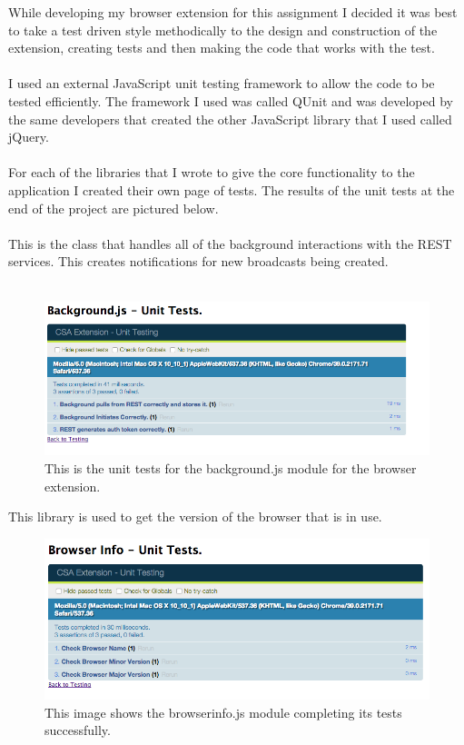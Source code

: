 \documentclass{article}
\begin{document}
While developing my browser extension for this assignment I decided it was best to take a test driven style methodically to the design and construction of the extension, creating tests and then making the code that works with the test.\\
\\
I used an external JavaScript unit testing framework to allow the code to be tested efficiently. The framework I used was called QUnit and was developed by the same developers that created the other JavaScript library that I used called jQuery.\\
\\
For each of the libraries that I wrote to give the core functionality to the application I created their own page of tests. The results of the unit tests at the end of the project are pictured below.\\
\\
This is the class that handles all of the background interactions with the REST services. This creates notifications for new broadcasts being created.\\
\\
\begin{figure}[H]
\centering
\includegraphics[width=\textwidth]{backgroundqunit}
\caption{This is the unit tests for the background.js module for the browser extension.}
\end{figure}

This library is used to get the version of the browser that is in use.\\

\begin{figure}[H]
\centering
\includegraphics[width=\textwidth]{biqunit}
\caption{This image shows the browserinfo.js module completing its tests successfully.}
\end{figure}
\end{document}
